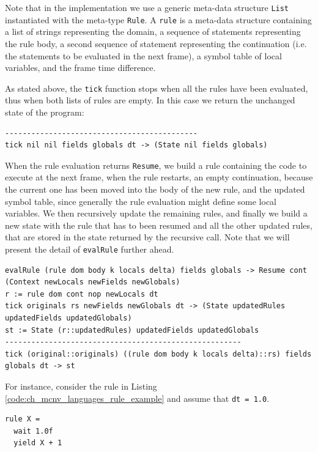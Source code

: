 \noindent
Note that in the implementation we use a generic meta-data structure \texttt{List} instantiated with the meta-type \texttt{Rule}. A \texttt{rule} is a meta-data structure containing a list of strings representing the domain, a sequence of statements representing the rule body, a second sequence of statement representing the continuation (i.e. the statements to be evaluated in the next frame), a symbol table of local variables, and the frame time difference.

As stated above, the \texttt{tick} function stops when all the rules have been evaluated, thus when both lists of rules are empty. In this case we return the unchanged state of the program:

\begin{lstlisting}
--------------------------------------------
tick nil nil fields globals dt -> (State nil fields globals)
\end{lstlisting}

When the rule evaluation returns \texttt{Resume}, we build a rule containing the code to execute at the next frame, when the rule restarts, an empty continuation, because the current one has been moved into the body of the new rule, and the updated symbol table, since generally the rule evaluation might define some local variables. We then recursively update the remaining rules, and finally we build a new state with the rule that has to been resumed and all the other updated rules, that are stored in the state returned by the recursive call. Note that we will present the detail of \texttt{evalRule} further ahead.

\begin{lstlisting}
evalRule (rule dom body k locals delta) fields globals -> Resume cont (Context newLocals newFields newGlobals)
r := rule dom cont nop newLocals dt
tick originals rs newFields newGlobals dt -> (State updatedRules updatedFields updatedGlobals)
st := State (r::updatedRules) updatedFields updatedGlobals
------------------------------------------------------
tick (original::originals) ((rule dom body k locals delta)::rs) fields globals dt -> st
\end{lstlisting}

\noindent
For instance, consider the rule in Listing \ref{code:ch_mcnv_languages_rule_example} and assume that \texttt{dt = 1.0}.

\begin{lstlisting}[caption = Rule example with interruption, label = code:ch_mcnv_languages_rule_example]
rule X =
  wait 1.0f
  yield X + 1
\end{lstlisting}


